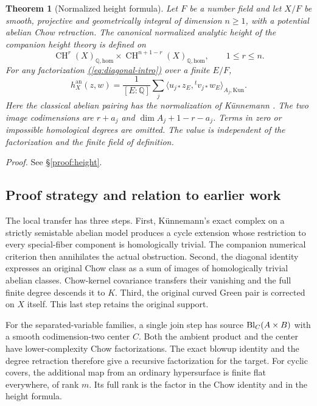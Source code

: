 \documentclass[11pt,a4paper]{article}
\newtheorem{theorem}{Theorem}[section]
\theoremstyle{definition}
\theoremstyle{remark}\newtheorem{remark}[theorem]{Remark}
\numberwithin{equation}{section}
\newcommand{\Q}{\mathbb Q}\newcommand{\R}{\mathbb R}\newcommand{\C}{\mathbb C}
\newcommand{\CH}{\operatorname{CH}}\newcommand{\an}{\mathrm{an}}
\newcommand{\homol}{\mathrm{hom}}\newcommand{\BC}{\mathrm{BC}}
\newcommand{\subref}[1]{\hyperref[#1]{\textcolor{sectionlink}{\S\ref*{#1}}}}
\renewcommand{\eqref}[1]{\hyperref[#1]{\textcolor{equationlink}{(\ref*{#1})}}}
\newcommand{\proofloc}[1]{\emph{Proof.} See \subref{#1}.}
\begin{document}
\begin{theorem}[Normalized height formula]\label{thm:height-main}
Let $F$ be a number field and let $X/F$ be smooth, projective and
geometrically integral of dimension $n\ge1$, with a potential abelian
Chow retraction. The canonical normalized analytic height of the companion
height theory is defined on
\begin{equation}\label{eq:height-domain}
 \CH^r(X)_{\Q,\homol}\times\CH^{n+1-r}(X)_{\Q,\homol},
 \qquad 1\le r\le n.
\end{equation}
For any factorization \eqref{eq:diagonal-intro} over a finite $E/F$,
\begin{equation}\label{eq:height-main}
 h_X^{\an}(z,w)=\frac1{[E:\Q]}\sum_j
       \bigl\langle u_{j*}z_E,{}^tv_{j*}w_E\bigr\rangle_{A_j,\mathrm{Kun}}.
\end{equation}
Here the classical abelian pairing has the normalization of K\"unnemann
\cite{Kun}. The two image codimensions are
$r+a_j$ and $\dim A_j+1-r-a_j$. Terms in zero or impossible homological
degrees are omitted. The value is independent of the factorization and
the finite field of definition.
\end{theorem}

\proofloc{proof:height}



\subsection{Proof strategy and relation to earlier work}

The local transfer has three steps. First, K\"unnemann's exact complex on
a strictly semistable abelian model produces a cycle extension whose
restriction to every special-fiber component is homologically trivial.
The companion numerical criterion then annihilates the actual
obstruction. Second, the diagonal identity expresses an original Chow
class as a sum of images of homologically trivial abelian classes.
Chow-kernel covariance transfers their vanishing and the full finite
degree descends it to $K$. Third, the original curved Green pair is
corrected on $X$ itself. This last step retains the original support.

For the separated-variable families, a single join step has source
$\operatorname{Bl}_C(A\times B)$ with a smooth codimension-two center $C$. Both the
ambient product and the center have lower-complexity Chow factorizations.
The exact blowup identity and the degree retraction therefore give a
recursive factorization for the target. For cyclic covers, the additional
map from an ordinary hypersurface is finite flat everywhere, of rank $m$.
Its full rank is the factor in the Chow identity and in the height formula.
\end{document}
